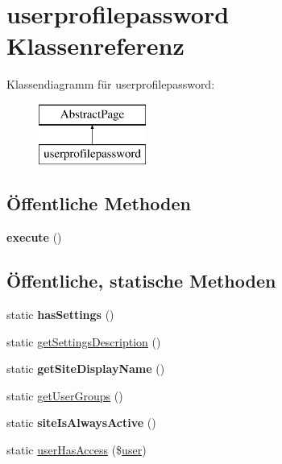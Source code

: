 \hypertarget{classuserprofilepassword}{}\section{userprofilepassword Klassenreferenz}
\label{classuserprofilepassword}
Klassendiagramm für userprofilepassword\+:\begin{figure}[H]
\begin{center}
\leavevmode
\includegraphics[height=2.000000cm]{classuserprofilepassword}
\end{center}
\end{figure}
\subsection*{Öffentliche Methoden}
\begin{DoxyCompactItemize}
\item 
\mbox{\label{classuserprofilepassword_a37ca295e2a78f6d711ae106a02c42a68}} 
{\bfseries execute} ()
\end{DoxyCompactItemize}
\subsection*{Öffentliche, statische Methoden}
\begin{DoxyCompactItemize}
\item 
\mbox{\label{classuserprofilepassword_a86cf58b73c70fa44115548426d1275f0}} 
static {\bfseries has\+Settings} ()
\item 
static \mbox{\hyperlink{classuserprofilepassword_adf648cadc203ef9ba955696b15052f6f}{get\+Settings\+Description}} ()
\item 
\mbox{\label{classuserprofilepassword_a6cbaf51265cf1c3a00c5358dfc353567}} 
static {\bfseries get\+Site\+Display\+Name} ()
\item 
static \mbox{\hyperlink{classuserprofilepassword_ac1fa76d498277c5768709301d384b98a}{get\+User\+Groups}} ()
\item 
\mbox{\label{classuserprofilepassword_af28e7027f9288c6c36a45fbb2bb63323}} 
static {\bfseries site\+Is\+Always\+Active} ()
\item 
static \mbox{\hyperlink{classuserprofilepassword_afb3180bca662223fd08778c78547e6ce}{user\+Has\+Access}} (\$\mbox{\hyperlink{classuser}{user}})
\end{DoxyCompactItemize}
